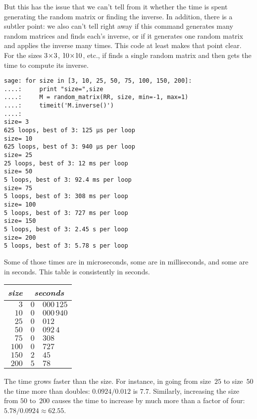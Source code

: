 But this has the issue that we can't tell from it  
whether the time is spent generating
the random matrix or finding the inverse.
In addition, there is a subtler point: we also can't tell right away if
this command generates many random matrices and finds 
each's inverse,
or if it generates one random matrix and applies the inverse many times.
This code at least makes that point clear.
For the sizes $3 \! \times \! 3$, $10 \! \times \! 10$, etc.,
if finds a single random matrix and then 
gets the time to compute its inverse.
\begin{lstlisting}
sage: for size in [3, 10, 25, 50, 75, 100, 150, 200]:
....:     print "size=",size
....:     M = random_matrix(RR, size, min=-1, max=1)
....:     timeit('M.inverse()')
....: 
size= 3
625 loops, best of 3: 125 µs per loop
size= 10
625 loops, best of 3: 940 µs per loop
size= 25
25 loops, best of 3: 12 ms per loop
size= 50
5 loops, best of 3: 92.4 ms per loop
size= 75
5 loops, best of 3: 308 ms per loop
size= 100
5 loops, best of 3: 727 ms per loop
size= 150
5 loops, best of 3: 2.45 s per loop
size= 200
5 loops, best of 3: 5.78 s per loop
\end{lstlisting}
Some of those times are in microseconds, some are in milliseconds, and some
are in seconds.
This table is consistently in seconds.
\begin{center}
  \begin{tabular}{r|r@{.}l}
    \textit{size}     &\multicolumn{2}{c}{\textit{seconds}}  \\  \hline
    $3$      &$0$ &$000\,125$ \\
    $10$     &$0$ &$000\,940$ \\
    $25$     &$0$ &$012$ \\
    $50$     &$0$ &$092\,4$ \\
    $75$     &$0$ &$308$ \\
    $100$    &$0$ &$727$ \\
    $150$    &$2$ &$45$ \\
    $200$    &$5$ &$78$ 
  \end{tabular}
\end{center}
The time grows faster than the size.
For instance, in going from size~$25$ to size~$50$ the time more than
doubles: $0.0924/0.012$ is $7.7$.
Similarly, increasing the size from $50$ to~$200$ causes the time to 
increase by much more than a factor of four: $5.78/0.0924\approx 62.55$. 

